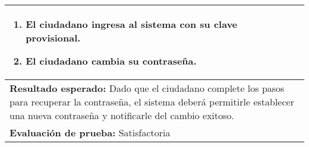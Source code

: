 \begin{longtable}{|p{6.7cm}|p{6.7cm}|}
{\begin{enumerate}
        \item El ciudadano ingresa al sistema con su clave provisional.
        \item El ciudadano cambia su contraseña.
    \end{enumerate}}                                                                                                                                \\
    \hline
    \multicolumn{2}{|p{13.4cm}|}{\textbf{Resultado esperado:} Dado que el ciudadano complete los pasos para recuperar la contraseña, el sistema deberá permitirle establecer una nueva contraseña y notificarle del cambio exitoso.} \\
    \hline
    \multicolumn{2}{|p{13.4cm}|}{\textbf{Evaluación de prueba:} Satisfactoria}                                                                                                                                                       \\
    \hline
\end{longtable}


